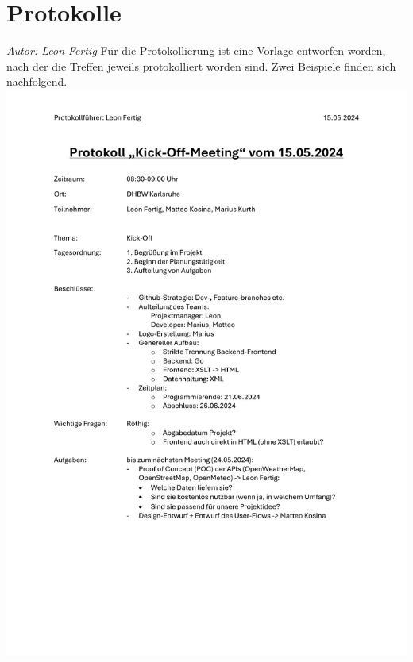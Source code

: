 \documentclass[12pt]{article}
\begin{document}
\section{Protokolle}
{\it Autor: Leon Fertig}
\newline
Für die Protokollierung ist eine Vorlage entworfen worden, nach der die Treffen jeweils protokolliert worden sind. Zwei Beispiele finden sich nachfolgend.
\newline
\includegraphics[width=\textwidth]{Planungsdokumente/graphics/Protokoll1.pdf}
\end{document}
